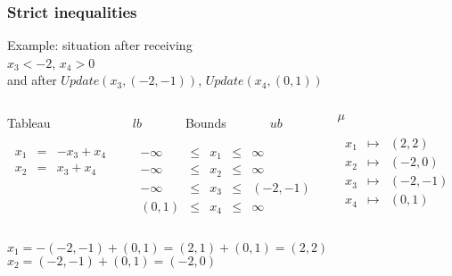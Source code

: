 \begin{frame}
  \frametitle{Strict inequalities}

  \scriptsize

  Example: situation after receiving \\ 
  $x_3 < -2$, $x_4 > 0$ \\
  and after $Update(x_3,(-2,-1))$, $Update(x_4,(0,1))$

  \vfill

  \begin{columns}

  \begin{column}{.3\textwidth}
  \begin{center}
  Tableau
  \end{center}
  $$
  \begin{array}{rcl}
    x_1 & = & - x_3 + x_4  \\ 
    x_2 & = &   x_3 + x_4  \\ 
    \\
    \\
  \end{array}
  $$
  \end{column}

  \begin{column}{.4\textwidth}
  \begin{center}
  $lb$~~~~~~~Bounds~~~~~~~$ub$
  \end{center}
  $$
  \begin{array}{rcccl}
      - \infty  & \leq & x_1 & \leq & \infty \\
      - \infty  & \leq & x_2 & \leq & \infty \\
      - \infty  & \leq & x_3 & \leq & (-2,-1) \\
          (0,1) & \leq & x_4 & \leq & \infty
  \end{array}
  $$
  \end{column}

  \begin{column}{.3\textwidth}
  \begin{center}
  $\mu$
  \end{center}
  $$
  \begin{array}{rcl}
  x_1 & \mapsto &   (2,2) \\
  x_2 & \mapsto &  (-2,0) \\
  x_3 & \mapsto & (-2,-1) \\
  x_4 & \mapsto &   (0,1) 
  \end{array}
  $$
  \end{column}

  \end{columns}
  \vfill
  $x_1 = - (-2,-1) + (0,1) = (2,1) + (0,1) = (2,2)$ \\
  $x_2 =   (-2,-1) + (0,1) = (-2,0)$ 

\end{frame}
